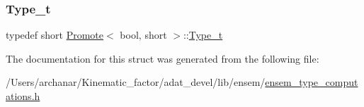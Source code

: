 \subsubsection{\texorpdfstring{Type\_t}{Type\_t}\hspace{0.1cm}{\footnotesize\ttfamily [2/2]}}
{\footnotesize\ttfamily typedef short \mbox{\hyperlink{structPromote}{Promote}}$<$ bool, short $>$\+::\mbox{\hyperlink{structPromote_3_01bool_00_01short_01_4_aca2abaabb10b6748b41ca6064716e6b4}{Type\+\_\+t}}}



The documentation for this struct was generated from the following file\+:\begin{DoxyCompactItemize}
\item 
/\+Users/archanar/\+Kinematic\+\_\+factor/adat\+\_\+devel/lib/ensem/\mbox{\hyperlink{lib_2ensem_2ensem__type__computations_8h}{ensem\+\_\+type\+\_\+computations.\+h}}\end{DoxyCompactItemize}
